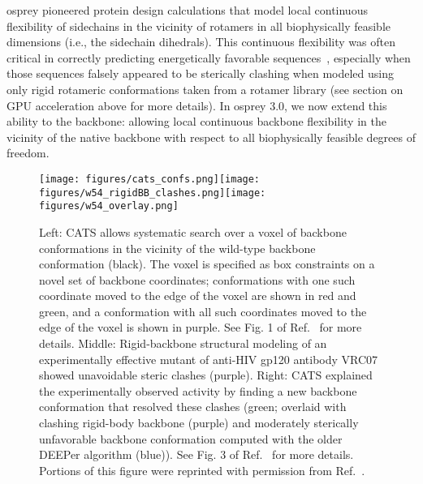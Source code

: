 {\sc osprey} pioneered protein design calculations that model local continuous flexibility of sidechains in the vicinity of rotamers in all biophysically feasible dimensions (i.e., the sidechain dihedrals).  This continuous flexibility was often critical in correctly predicting energetically favorable sequences~\cite{iMinDEE,OSPREY_MIE}, especially when those sequences falsely appeared to be sterically clashing when modeled using only rigid rotameric conformations taken from a rotamer library (see section on GPU acceleration above for more details).  In {\sc osprey} 3.0, we now extend this ability to the backbone: allowing local continuous backbone flexibility in the vicinity of the native backbone with respect to all biophysically feasible degrees of freedom.  

\begin{figure}
\texttt{[image: figures/cats\_confs.png]}\hspace{0.2in}\texttt{[image: figures/w54\_rigidBB\_clashes.png]}\hspace{0.2in}\texttt{[image: figures/w54\_overlay.png]}
\caption{Left: CATS allows systematic search over a voxel of backbone conformations in the vicinity of the wild-type backbone conformation (black).  The voxel is specified as box constraints on a novel set of backbone coordinates; conformations with one such coordinate moved to the edge of the voxel are shown in red and green, and a conformation with all such coordinates moved to the edge of the voxel is shown in purple.  See Fig. 1 of Ref.~ for more details.  Middle: Rigid-backbone structural modeling of an experimentally effective mutant of anti-HIV gp120 antibody VRC07 showed unavoidable steric clashes (purple).  Right: CATS explained the experimentally observed activity by finding a new backbone conformation that resolved these clashes (green; overlaid with clashing rigid-body backbone (purple) and moderately sterically unfavorable backbone conformation computed with the older DEEPer algorithm (blue)).  See Fig. 3 of Ref.~ for more details.   Portions of this figure were reprinted with permission from Ref.~.  }
\label{fig:cats}
\end{figure}

